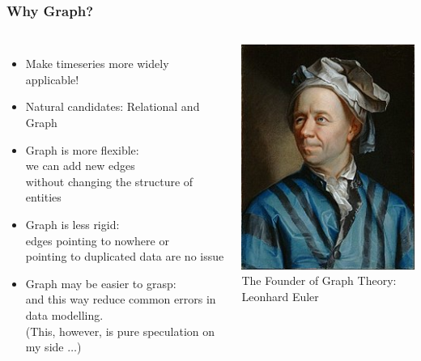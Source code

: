 \documentclass[mathserif,usenames,dvipsnames]{beamer}
\begin{document}
\begin{frame}
\frametitle{Why Graph?}
\begin{columns}[T]
\begin{itemize}
\item Make timeseries more widely applicable!
\item Natural candidates: Relational and Graph
\item Graph is more flexible:\\
      we can add new edges \\
      without changing the structure of entities
\item Graph is less rigid:\\
      edges pointing to nowhere or\\
            pointing to duplicated data are no issue
\item Graph may be easier to grasp:\\
      and this way reduce common errors in data modelling.\\
      (This, however, is pure speculation on my side $\dots$)
\end{itemize}
\begin{center}
\vskip0.8cm
\linewidth
\includegraphics[width=0.75\linewidth]{../img/leoeuler.jpg}\\
\vskip-0.2cm
\hskip-0.6cm
{\tiny The Founder of Graph Theory:}
\vskip-0.2cm
\hskip-0.6cm
{\tiny Leonhard Euler}
\end{center}
\end{columns}
\end{frame}
\end{document}
